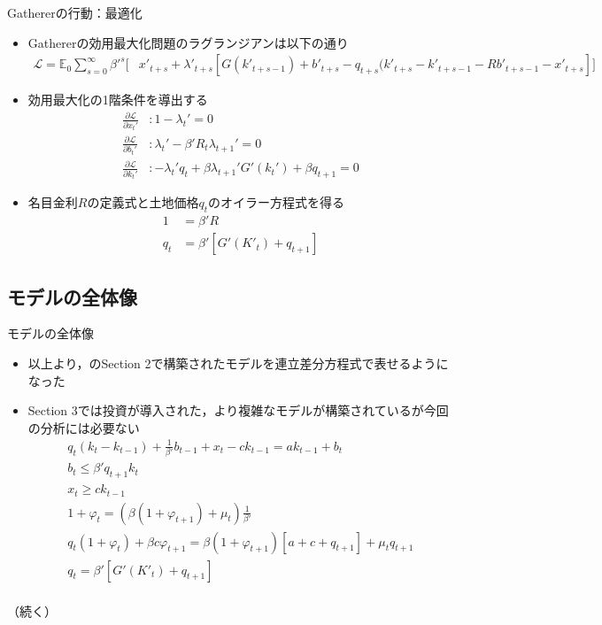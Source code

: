 \documentclass[aspectratio=169, dvipdfmx, 11pt, uplatex]{beamer}
\begin{document}
\begin{frame}{Gathererの行動：最適化}
  \begin{itemize}
    \item Gathererの効用最大化問題のラグランジアンは以下の通り
      \begin{equation}
        \begin{aligned}
          \mathcal{L} = \mathbb{E}_0 \sum_{s=0}^{\infty} \beta'^s \bigg[ & x'_{t+s} + \lambda'_{t+s} [G(k'_{t+s-1}) + b'_{t+s} - q_{t+s} (k'_{t+s} - k'_{t+s-1} - R b'_{t+s-1} - x'_{t+s}] \bigg]
        \end{aligned}
      \end{equation}
    \item 効用最大化の1階条件を導出する
      \begin{align}
        \frac{\partial \mathcal{L}}{\partial x_t'} &: 1 - \lambda_t' = 0 \\
        \frac{\partial \mathcal{L}}{\partial b_t'} &: \lambda_t' - \beta' R_t \lambda_{t+1}' = 0 \\
        \frac{\partial \mathcal{L}}{\partial k_t'} &: -\lambda_t' q_t + \beta \lambda_{t+1}' G'(k_t') + \beta q_{t+1} = 0
      \end{align}
    \item 名目金利$R$の定義式と土地価格$q_t$のオイラー方程式を得る
      \begin{align}
        1 &= \beta' R \label{eq:rishi} \\
        q_t &= \beta' [G'(K'_t) + q_{t+1}]
      \end{align}
  \end{itemize}
\end{frame}

\subsection{モデルの全体像}
\begin{frame}{モデルの全体像}
  \begin{itemize}
    \item 以上より，\textcite{KM1997}のSection 2で構築されたモデルを連立差分方程式で表せるようになった
    \item Section 3では投資が導入された，より複雑なモデルが構築されているが今回の分析には必要ない
      \begin{gather}
        q_t(k_t - k_{t-1}) + \frac{1}{\beta'} b_{t-1} + x_t - c k_{t-1} = a k_{t-1} + b_t \label{eq:model1} \\
        b_t \leq \beta' q_{t+1} k_t \label{eq:model2} \\
        x_t \geq c k_{t-1} \\
        1 + \varphi_t = (\beta(1+\varphi_{t+1}) + \mu_t) \frac{1}{\beta'} \label{} \\
        q_t (1 + \varphi_t) + \beta c \varphi_{t+1} = \beta(1 + \varphi_{t+1})[a + c + q_{t+1}] + \mu_t q_{t+1} \\
        q_t = \beta' [G'(K'_t) + q_{t+1}] \\
      \end{gather}
  \end{itemize}
  （続く）
\end{frame}
\end{document}
